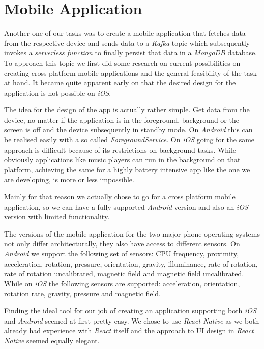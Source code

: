 \section{Mobile Application}

Another one of our tasks was to create a mobile application that fetches data from the respective
device and sends data to a \textit{Kafka} topic which subsequently invokes a \textit{serverless
function} to finally persist that data in a \textit{MongoDB} database. To approach this topic we
first did some research on current possibilities on creating cross platform mobile applications and
the general feasibility of the task at hand. It became quite apparent early on that the desired
design for the application is not possible on \textit{iOS}.

The idea for the design of the app is actually rather simple. Get data from the device, no matter if
the application is in the foreground, background or the screen is off and the device subsequently
in standby mode. On \textit{Android} this can be realised easily with a so called
\textit{ForegroundService}. On \textit{iOS} going for the same approach is difficult because of its
restrictions on background tasks. While obviously applications like music players can run in the
background on that platform, achieving the same for a highly battery intensive app like the one we
are developing, is more or less impossible.

Mainly for that reason we actually chose to go for a cross platform mobile application, so we can
have a fully supported \textit{Android} version and also an \textit{iOS} version with limited
functionality.

The versions of the mobile application for the two major phone operating systems not only differ
architecturally, they also have access to different sensors. On \textit{Android} we support the
following set of sensors: CPU frequency, proximity, acceleration, rotation, pressure, orientation,
gravity, illuminance, rate of rotation, rate of rotation uncalibrated, magnetic field and magnetic
field uncalibrated. While on \textit{iOS} the following sensors are supported: acceleration,
orientation, rotation rate, gravity, pressure and magnetic field.

Finding the ideal tool for our job of creating an application supporting both \textit{iOS} and
\textit{Android} seemed at first pretty easy. We chose to use \textit{React Native}
\cite{react-native} as we both already had experience with \textit{React} \cite{react} itself and
the approach to UI design in \textit{React Native} seemed equally elegant.

